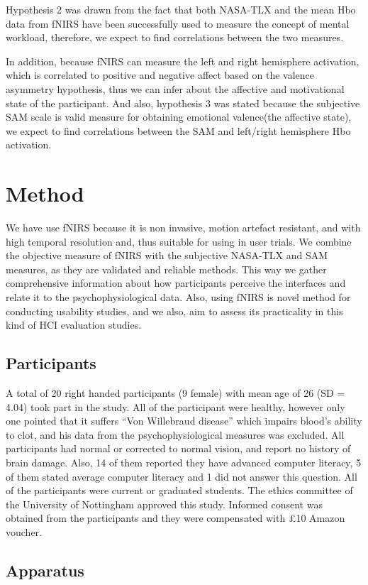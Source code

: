 \documentclass[a4paper]{report}
\begin{document}
	Hypothesis 2 was drawn from the fact that both NASA-TLX and the mean Hbo data from fNIRS have been successfully used to measure the concept of mental workload, therefore, we expect to find correlations between the two measures.
	
	In addition, because fNIRS can measure the left and right hemisphere activation, which is correlated to positive and negative affect based on the valence asymmetry hypothesis, thus we can infer about the affective and motivational state of the participant. And also, hypothesis 3 was stated because the subjective SAM scale is valid measure for obtaining emotional valence(the affective state), we expect to find correlations between the SAM and left/right hemisphere Hbo activation.
	
	
	\section{Method}
	We have use fNIRS because it is non invasive, motion artefact resistant, and with high temporal resolution and, thus suitable for using in user trials. We combine the objective measure of fNIRS with the subjective NASA-TLX and SAM measures, as they are validated and reliable methods. This way we gather comprehensive information about how participants perceive the interfaces and relate it to the psychophysiological data. Also, using fNIRS is novel method for conducting usability studies, and we also, aim to assess its practicality in this kind of HCI evaluation studies.

		\subsection{Participants}
		A total of 20 right handed participants (9 female) with mean age of 26 (SD = 4.04) took part in the study. All of the participant were healthy, however only one pointed that it suffers ``Von Willebraud disease'' which impairs blood's ability to clot, and his data from the psychophysiological measures was excluded. All participants had normal or corrected to normal vision, and report no history of brain damage. Also, 14 of them reported they have advanced computer literacy, 5 of them stated average computer literacy and 1 did not answer this question. All of the participants were current or graduated students. The ethics committee of the University of Nottingham approved this study. Informed consent was obtained from the participants and they were compensated with £10 Amazon voucher.
		\subsection{Apparatus}
\end{document}
